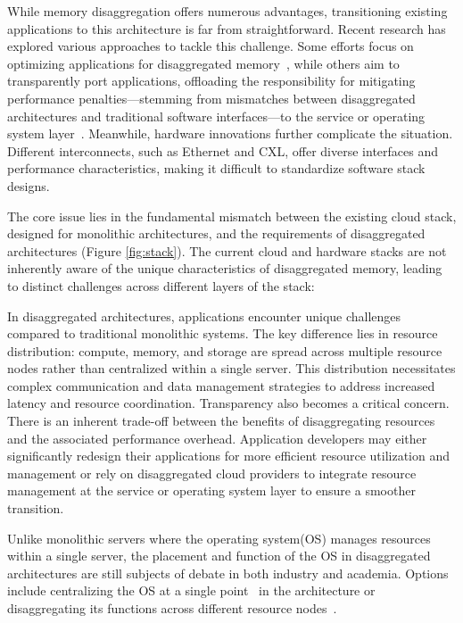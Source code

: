 While memory disaggregation offers numerous advantages, transitioning existing applications to this architecture is far from straightforward. Recent research has explored various approaches to tackle this challenge. Some efforts focus on optimizing applications for disaggregated memory~\cite{farm, aifm, sherman, existing1}, while others aim to transparently port applications, offloading the responsibility for mitigating performance penalties—stemming from mismatches between disaggregated architectures and traditional software interfaces—to the service or operating system layer~\cite{mind, legoos, fastswap, infiniswap, runtime1, runtime2}. Meanwhile, hardware innovations further complicate the situation. Different interconnects, such as Ethernet and CXL, offer diverse interfaces and performance characteristics, making it difficult to standardize software stack designs.


The core issue lies in the fundamental mismatch between the existing cloud stack, designed for monolithic architectures, and the requirements of disaggregated architectures (Figure \ref{fig:stack}). The current cloud and hardware stacks are not inherently aware of the unique characteristics of disaggregated memory, leading to distinct challenges across different layers of the stack:

 In disaggregated architectures, applications encounter unique challenges compared to traditional monolithic systems. The key difference lies in resource distribution: compute, memory, and storage are spread across multiple resource nodes rather than centralized within a single server. This distribution necessitates complex communication and data management strategies to address increased latency and resource coordination. Transparency also becomes a critical concern. There is an inherent trade-off between the benefits of disaggregating resources and the associated performance overhead. Application developers may either significantly redesign their applications for more efficient resource utilization and management or rely on disaggregated cloud providers to integrate resource management at the service or operating system layer to ensure a smoother transition.

 Unlike monolithic servers where the operating system(OS) manages resources within a single server, the placement and function of the OS in disaggregated architectures are still subjects of debate in both industry and academia. Options include centralizing the OS at a single point~\cite{mind, chase} in the architecture or disaggregating its functions across different resource nodes~\cite{legoos}.

